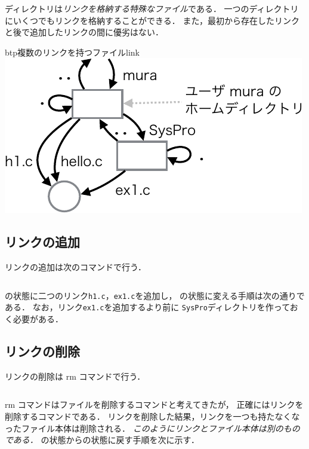 ディレクトリは\emph{リンクを格納する特殊なファイル}である．
一つのディレクトリにいくつでもリンクを格納することができる．
また，最初から存在したリンクと後で追加したリンクの間に優劣はない．

\begin{myfig}{btp}{複数のリンクを持つファイル}{link}
\includegraphics[scale=1.0]{Fig/Link-crop.pdf}
\end{myfig}

\subsection*{リンクの追加}
リンクの追加は次のコマンドで行う．

\begin{lstlisting}[numbers=none]
% ln ファイルへのパス 追加するリンクのパス
\end{lstlisting}

の状態に二つのリンク\texttt{h1.c}，\texttt{ex1.c}を追加し，
の状態に変える手順は次の通りである．
なお，リンク\texttt{ex1.c}を追加するより前に
\texttt{SysPro}ディレクトリを作っておく必要がある．



\subsection*{リンクの削除}

リンクの削除は rm コマンドで行う．

\begin{lstlisting}[numbers=none]
% rm ファイルへのパス
\end{lstlisting}

rm コマンドはファイルを削除するコマンドと考えてきたが，
正確にはリンクを削除するコマンドである．
リンクを削除した結果，リンクを一つも持たなくなったファイル本体は削除される．
\emph{このようにリンクとファイル本体は別のものである．}
の状態からの状態に戻す手順を次に示す．

